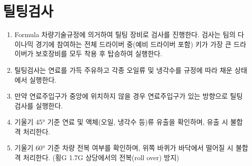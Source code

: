 \documentclass[final,a4paper,10pt]{report}
\begin{document}
\section{틸팅검사}\label{rule:formula-competition.tilt-test}
\begin{enumerate}
  \item\label{rule:formula-competition.tilt-test.tallest-driver-full-gear} Formula 차량기술규정에 의거하여 틸팅 장비로 검사를 진행한다. 검사는 팀의 다이나믹 경기에 참여하는 전체 드라이버 중(예비 드라이버 포함) 키가 가장 큰 드라이버가 보호장비를 모두 착용 후 탑승하여 실행한다.
  \item\label{rule:formula-competition.tilt-test.full-fuel-and-fluids} 틸팅검사는 연료를 가득 주유하고 각종 오일류 및 냉각수를 규정에 따라 채운 상태에서 실행한다.
  \item\label{rule:formula-competition.tilt-test.direction-toward-fuel-filler} 만약 연료주입구가 중앙에 위치하지 않을 경우 연료주입구가 있는 방향으로 틸팅 검사를 실행한다.
  \item\label{rule:formula-competition.tilt-test.leak-check-at-45deg} 기울기 45° 기준 연료 및 액체(오일, 냉각수 등)류 유출을 확인하며, 유출 시 불합격 처리한다.
  \item\label{rule:formula-competition.tilt-test.rollover-check-at-60deg} 기울기 60° 기준 차량 전복 여부를 확인하며, 위쪽 바퀴가 바닥에서 떨어질 시 불합격 처리한다. (횡G 1.7G 상당에서의 전복(roll over) 방지)
\end{enumerate}
\end{document}
